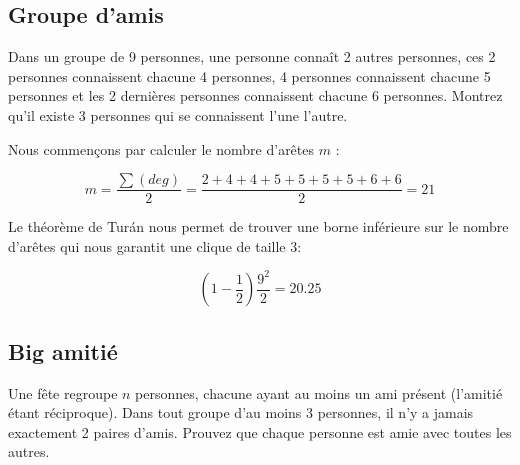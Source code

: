 \subsection{Groupe d'amis}
Dans un groupe de 9 personnes, une personne connaît 2 autres personnes, ces 2 personnes connaissent chacune 4 personnes, 4 personnes connaissent chacune 5 personnes et les 2 dernières personnes connaissent chacune 6 personnes. Montrez qu'il existe 3 personnes qui se connaissent l'une l'autre.

\begin{solution}
Nous commençons par calculer le nombre d'arêtes $m$ :

$$m=\frac{\sum(deg)}{2}=\frac{2+4+4+5+5+5+5+6+6}{2}=21$$

Le théorème de Turán nous permet de trouver une borne inférieure sur le nombre d'arêtes qui nous garantit une clique de taille 3:

$$\left(1-\frac{1}{2}\right)\frac{9^2}{2}=20.25$$
\end{solution}

\subsection{Big amitié}
Une fête regroupe $n$ personnes, chacune ayant au moins un ami présent (l'amitié étant réciproque). Dans tout groupe d'au moins 3 personnes, il n'y a jamais exactement 2 paires d'amis. Prouvez que chaque personne est amie avec toutes les autres.

